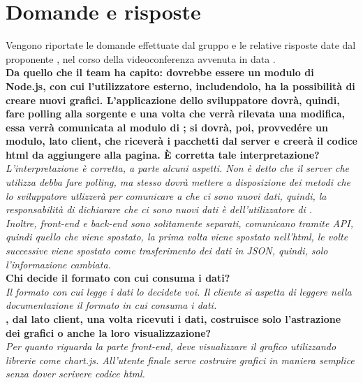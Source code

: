 
\section{Domande e risposte}
Vengono riportate le domande effettuate dal gruppo \groupname{} e le relative risposte date dal proponente \proponente{}, nel corso della videoconferenza avvenuta in data .\\
	
	\textbf{Da quello che il team ha capito: \projectname{} dovrebbe essere un modulo di Node.js, con cui l'utilizzatore esterno, includendolo, ha la possibilità di creare nuovi grafici. L'applicazione dello sviluppatore dovrà, quindi, fare polling alla sorgente e una volta che verrà rilevata una modifica, essa verrà comunicata al modulo di \projectname{}; si dovrà, poi, provvedére un modulo, lato client, che riceverà i pacchetti dal server e creerà il codice html da aggiungere alla pagina. \`{E} corretta tale interpretazione?}\\
	\textit{L'interpretazione è corretta, a parte alcuni aspetti. Non è detto che il server che utilizza \projectname{} debba fare polling, ma \projectname{} stesso dovrà mettere a disposizione dei metodi che lo sviluppatore utlizzerà per comunicare a \projectname{} che ci sono nuovi dati, quindi, la responsabilità di dichiarare che ci sono nuovi dati è dell'utilizzatore di \projectname{}.\\
	Inoltre, front-end e back-end sono solitamente separati, comunicano tramite API, quindi quello che viene spostato, la prima volta viene spostato nell'html, le volte successive viene spostato come trasferimento dei dati in JSON, quindi, solo l'informazione cambiata.}\\
	
	\textbf{Chi decide il formato con cui \projectname{} consuma i dati?}\\
	\textit{Il formato con cui \projectname{} legge i dati lo decidete voi. Il cliente si aspetta di leggere nella documentazione il formato in cui \projectname{} consuma i dati.}\\
	
	\textbf{\projectname{}, dal lato client, una volta ricevuti i dati, costruisce solo l'astrazione dei grafici o anche la loro visualizzazione?}\\
	\textit{Per quanto riguarda la parte front-end, \projectname{} deve visualizzare il grafico utilizzando librerie come chart.js. All'utente finale serve costruire grafici in maniera semplice senza dover scrivere codice html.}\\
	
